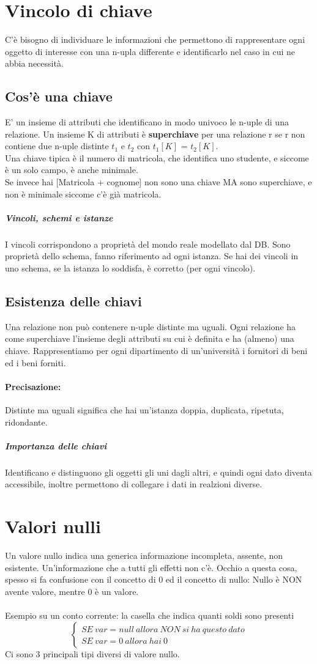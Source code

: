 \documentclass[12pt, a4paper, openany, twoside]{book}
\begin{document}
\section{Vincolo di chiave}
C'è bisogno di individuare le informazioni che permettono di rappresentare ogni
oggetto di interesse con una n-upla differente e identificarlo nel caso in
cui ne abbia necessità.
\subsection{Cos'è una chiave} E' un insieme di attributi che identificano in modo
univoco le n-uple di una relazione. 
Un insieme K di attributi è \textbf{superchiave} per una relazione r se r non 
contiene due n-uple distinte $t_{1}$ e $t_{2}$ con $t_{1}[K]$ = $t_{2}[K]$.
\\ Una chiave tipica è il numero di matricola, che identifica uno studente, e
siccome è un solo campo, è anche minimale. \\
Se invece hai [Matricola + cognome] non sono una chiave MA sono superchiave, 
e non è minimale siccome c'è già matricola.
\subparagraph{Vincoli, schemi e istanze}
I vincoli corrispondono a proprietà del mondo reale modellato dal DB. Sono
proprietà dello schema, fanno riferimento ad ogni istanza. Se hai dei vincoli
in uno schema, se la istanza lo soddisfa, è corretto (per ogni vincolo).	
\subsection{Esistenza delle chiavi}	
Una relazione non può contenere n-uple distinte ma uguali. Ogni relazione ha come
superchiave l'insieme degli attributi su cui è definita e ha (almeno) una chiave.
Rappresentiamo per ogni dipartimento di un'università i fornitori di beni ed i 
beni forniti.
\paragraph{Precisazione:} Distinte ma uguali significa che hai un'istanza doppia,
duplicata, ripetuta, ridondante. 
\subparagraph{Importanza delle chiavi}
Identificano e distinguono gli oggetti gli uni dagli altri, e quindi ogni dato
diventa accessibile, inoltre permettono di collegare i dati in realzioni diverse.
\section{Valori nulli}
Un valore nullo indica una generica informazione incompleta, assente, non 
esistente. Un'informazione che a tutti gli effetti non c'è. Occhio a questa cosa,
spesso si fa confusione con il concetto di 0 ed il concetto di nullo: Nullo è 
NON avente valore, mentre 0 è un valore.\\ \\
Esempio su un conto corrente: la casella che indica quanti soldi sono presenti
\[
\begin{cases}
	SE ~ var = null ~ allora ~ NON ~ si ~ ha ~ questo ~ dato\\
	SE ~ var = 0 ~ allora ~ hai ~ 0
\end{cases}
\]
Ci sono 3 principali tipi diversi di valore nullo.
\end{document}
